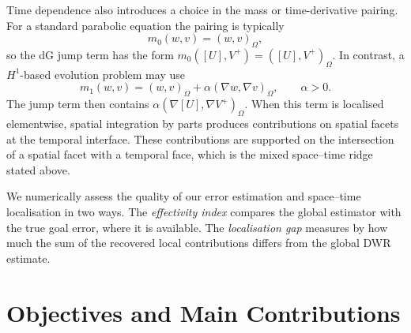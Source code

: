 Time dependence also introduces a choice in the mass or time-derivative pairing. For a standard parabolic equation the pairing is typically
\begin{equation*}
  m_0(w,v)=(w,v)_\Omega,
  \label{eq:intro-l2-mass-pairing}
\end{equation*}
so the dG jump term has the form $m_0([U],V^+) = ([U],V^+)_\Omega$. In contrast, a $H^1$-based evolution problem may use
\begin{equation*}
  m_1(w,v)=(w,v)_\Omega+\alpha(\nabla w,\nabla v)_\Omega,
  \qquad \alpha>0.
  \label{eq:intro-h1-mass-pairing}
\end{equation*}
The jump term then contains $\alpha(\nabla[U],\nabla V^+)_\Omega$. When this term is localised elementwise, spatial integration by parts produces contributions on spatial facets at the temporal interface. These contributions are supported on the intersection of a spatial facet with a temporal face, which is the mixed space--time ridge stated above.

We numerically assess the quality of our error estimation and space--time localisation in two ways. The \emph{effectivity index} compares the global estimator with the true goal error, where it is available. The \emph{localisation gap} measures by how much the sum of the recovered local contributions differs from the global DWR estimate.



\section{Objectives and Main Contributions}
\label{sec:introduction-contributions}

